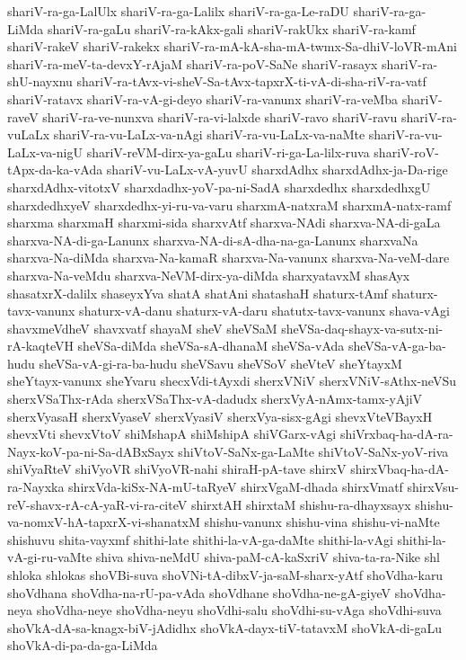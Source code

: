 {shariV-ra-ga-LalUlx
shariV-ra-ga-Lalilx
shariV-ra-ga-Le-raDU
shariV-ra-ga-LiMda
shariV-ra-gaLu
shariV-ra-kAkx-gali
shariV-rakUkx
shariV-ra-kamf
shariV-rakeV
shariV-rakekx
shariV-ra-mA-kA-sha-mA-twmx-Sa-dhiV-loVR-mAni
shariV-ra-meV-ta-devxY-rAjaM
shariV-ra-poV-SaNe
shariV-rasayx
shariV-ra-shU-nayxnu
shariV-ra-tAvx-vi-sheV-Sa-tAvx-tapxrX-ti-vA-di-sha-riV-ra-vatf
shariV-ratavx
shariV-ra-vA-gi-deyo
shariV-ra-vanunx
shariV-ra-veMba
shariV-raveV
shariV-ra-ve-nunxva
shariV-ra-vi-lalxde
shariV-ravo
shariV-ravu
shariV-ra-vuLaLx
shariV-ra-vu-LaLx-va-nAgi
shariV-ra-vu-LaLx-va-naMte
shariV-ra-vu-LaLx-va-nigU
shariV-reVM-dirx-ya-gaLu
shariV-ri-ga-La-lilx-ruva
shariV-roV-tApx-da-ka-vAda
shariV-vu-LaLx-vA-yuvU
sharxdAdhx
sharxdAdhx-ja-Da-rige
sharxdAdhx-vitotxV
sharxdadhx-yoV-pa-ni-SadA
sharxdedhx
sharxdedhxgU
sharxdedhxyeV
sharxdedhx-yi-ru-va-varu
sharxmA-natxraM
sharxmA-natx-ramf
sharxma
sharxmaH
sharxmi-sida
sharxvAtf
sharxva-NAdi
sharxva-NA-di-gaLa
sharxva-NA-di-ga-Lanunx
sharxva-NA-di-sA-dha-na-ga-Lanunx
sharxvaNa
sharxva-Na-diMda
sharxva-Na-kamaR
sharxva-Na-vanunx
sharxva-Na-veM-dare
sharxva-Na-veMdu
sharxva-NeVM-dirx-ya-diMda
sharxyatavxM
shasAyx
shasatxrX-dalilx
shaseyxYva
shatA
shatAni
shatashaH
shaturx-tAmf
shaturx-tavx-vanunx
shaturx-vA-danu
shaturx-vA-daru
shatutx-tavx-vanunx
shava-vAgi
shavxmeVdheV
shavxvatf
shayaM
sheV
sheVSaM
sheVSa-daq-shayx-va-sutx-ni-rA-kaqteVH
sheVSa-diMda
sheVSa-sA-dhanaM
sheVSa-vAda
sheVSa-vA-ga-ba-hudu
sheVSa-vA-gi-ra-ba-hudu
sheVSavu
sheVSoV
sheVteV
sheYtayxM
sheYtayx-vanunx
sheYvaru
shecxVdi-tAyxdi
sherxVNiV
sherxVNiV-sAthx-neVSu
sherxVSaThx-rAda
sherxVSaThx-vA-dadudx
sherxVyA-nAmx-tamx-yAjiV
sherxVyasaH
sherxVyaseV
sherxVyasiV
sherxVya-sisx-gAgi
shevxVteVBayxH
shevxVti
shevxVtoV
shiMshapA
shiMshipA
shiVGarx-vAgi
shiVrxbaq-ha-dA-ra-Nayx-koV-pa-ni-Sa-dABxSayx
shiVtoV-SaNx-ga-LaMte
shiVtoV-SaNx-yoV-riva
shiVyaRteV
shiVyoVR
shiVyoVR-nahi
shiraH-pA-tave
shirxV
shirxVbaq-ha-dA-ra-Nayxka
shirxVda-kiSx-NA-mU-taRyeV
shirxVgaM-dhada
shirxVmatf
shirxVsu-reV-shavx-rA-cA-yaR-vi-ra-citeV
shirxtAH
shirxtaM
shishu-ra-dhayxsayx
shishu-va-nomxV-hA-tapxrX-vi-shanatxM
shishu-vanunx
shishu-vina
shishu-vi-naMte
shishuvu
shita-vayxmf
shithi-late
shithi-la-vA-ga-daMte
shithi-la-vAgi
shithi-la-vA-gi-ru-vaMte
shiva
shiva-neMdU
shiva-paM-cA-kaSxriV
shiva-ta-ra-Nike
shl
shloka
shlokas
shoVBi-suva
shoVNi-tA-dibxV-ja-saM-sharx-yAtf
shoVdha-karu
shoVdhana
shoVdha-na-rU-pa-vAda
shoVdhane
shoVdha-ne-gA-giyeV
shoVdha-neya
shoVdha-neye
shoVdha-neyu
shoVdhi-salu
shoVdhi-su-vAga
shoVdhi-suva
shoVkA-dA-sa-knagx-biV-jAdidhx
shoVkA-dayx-tiV-tatavxM
shoVkA-di-gaLu
shoVkA-di-pa-da-ga-LiMda
}
